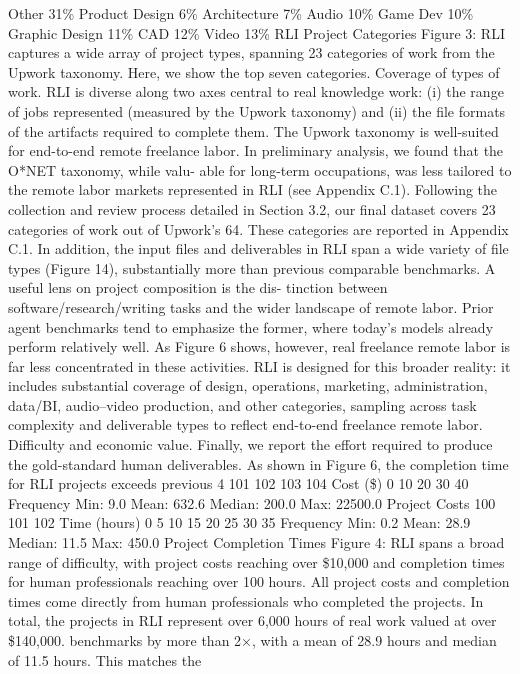 Other
31\%
Product
Design
6\%
Architecture
7\%
Audio
10\%
Game Dev
10\%
Graphic
Design
11\%
CAD
12\%
Video
13\%
RLI Project Categories
Figure 3: RLI captures a wide array of project
types, spanning 23 categories of work from the
Upwork taxonomy. Here, we show the top seven
categories.
Coverage of types of work.
RLI is diverse
along two axes central to real knowledge work:
(i) the range of jobs represented (measured by
the Upwork taxonomy) and (ii) the file formats
of the artifacts required to complete them. The
Upwork taxonomy is well-suited for end-to-end
remote freelance labor. In preliminary analysis,
we found that the O*NET taxonomy, while valu-
able for long-term occupations, was less tailored
to the remote labor markets represented in RLI
(see Appendix C.1). Following the collection
and review process detailed in Section 3.2, our
final dataset covers 23 categories of work out
of Upwork’s 64. These categories are reported
in Appendix C.1. In addition, the input files
and deliverables in RLI span a wide variety of
file types (Figure 14), substantially more than
previous comparable benchmarks.
A useful lens on project composition is the dis-
tinction between software/research/writing tasks
and the wider landscape of remote labor. Prior agent benchmarks tend to emphasize the former,
where today’s models already perform relatively well. As Figure 6 shows, however, real freelance
remote labor is far less concentrated in these activities. RLI is designed for this broader reality: it
includes substantial coverage of design, operations, marketing, administration, data/BI, audio–video
production, and other categories, sampling across task complexity and deliverable types to reflect
end-to-end freelance remote labor.
Difficulty and economic value.
Finally, we report the effort required to produce the gold-standard
human deliverables. As shown in Figure 6, the completion time for RLI projects exceeds previous
4
101
102
103
104
Cost (\$)
0
10
20
30
40
Frequency
Min: 9.0
Mean: 632.6
Median: 200.0
Max: 22500.0
Project Costs
100
101
102
Time (hours)
0
5
10
15
20
25
30
35
Frequency
Min: 0.2
Mean: 28.9
Median: 11.5
Max: 450.0
Project Completion Times
Figure 4: RLI spans a broad range of difficulty, with project costs reaching over \$10,000 and
completion times for human professionals reaching over 100 hours. All project costs and completion
times come directly from human professionals who completed the projects. In total, the projects in
RLI represent over 6,000 hours of real work valued at over \$140,000.
benchmarks by more than 2×, with a mean of 28.9 hours and median of 11.5 hours. This matches the
